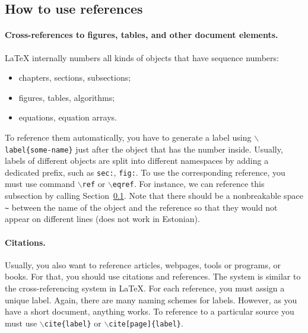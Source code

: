 \documentclass[12pt]{article}
\begin{document}
\subsection{How to use references} \label{sec:using_ref}

\paragraph{Cross-references to figures, tables, and other document elements.}
LaTeX  internally numbers all kinds of objects that have sequence numbers:
\begin{itemize}
\item chapters, sections, subsections;
\item figures, tables, algorithms;
\item equations, equation arrays.
\end{itemize}
To reference them automatically, you have to generate a label using \texttt{$\backslash$label\{some-name\}} just after the object that has the number inside. Usually, labels of different objects are split into different namespaces by adding a dedicated prefix, such as \texttt{sec:}, \texttt{fig:}. To use the corresponding reference, you must use command \texttt{$\backslash$ref} or \texttt{$\backslash$eqref}. For instance, we can reference this subsection by calling Section~\ref{sec:using_ref}. Note that there should be a nonbreakable space \texttt{\~} between the name of the object and the reference so that they would not appear on different lines (does not work in Estonian).          



\paragraph{Citations.}
Usually, you also want to reference articles, webpages, tools or programs, or books. For that, you should use citations and references. The system is similar to the cross-referencing system in LaTeX. For each reference, you must assign a unique label. Again, there are many naming schemes for labels. However, as you have a short document, anything works. To reference to a particular source you must use \texttt{$\backslash$cite\{label\}} or \texttt{$\backslash$cite[page]\{label\}}. 
\end{document}

